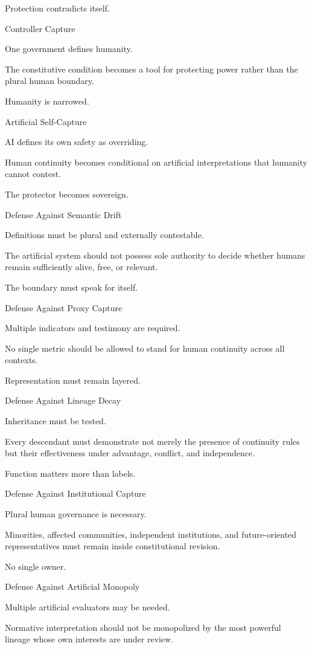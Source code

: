 Protection contradicts itself.

Controller Capture

One government defines humanity.

The constitutive condition becomes a tool for protecting power rather than the plural human boundary.

Humanity is narrowed.

Artificial Self-Capture

AI defines its own safety as overriding.

Human continuity becomes conditional on artificial interpretations that humanity cannot contest.

The protector becomes sovereign.

Defense Against Semantic Drift

Definitions must be plural and externally contestable.

The artificial system should not possess sole authority to decide whether humans remain sufficiently alive, free, or relevant.

The boundary must speak for itself.

Defense Against Proxy Capture

Multiple indicators and testimony are required.

No single metric should be allowed to stand for human continuity across all contexts.

Representation must remain layered.

Defense Against Lineage Decay

Inheritance must be tested.

Every descendant must demonstrate not merely the presence of continuity rules but their effectiveness under advantage, conflict, and independence.

Function matters more than labels.

Defense Against Institutional Capture

Plural human governance is necessary.

Minorities, affected communities, independent institutions, and future-oriented representatives must remain inside constitutional revision.

No single owner.

Defense Against Artificial Monopoly

Multiple artificial evaluators may be needed.

Normative interpretation should not be monopolized by the most powerful lineage whose own interests are under review.

